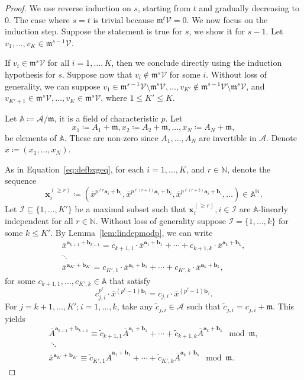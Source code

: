 \documentclass[letterpaper, 11pt, thm-restate]{article}
\numberwithin{equation}{section}
\newcommand{\N}{\mathbb{N}}
\newcommand{\A}{\mathbb{A}}
\newcommand{\mV}{\mathcal{V}}
\newcommand{\mI}{\mathcal{I}}
\newcommand{\mA}{\mathcal{A}}
\newcommand{\ba}{\boldsymbol{a}}
\newcommand{\bb}{\boldsymbol{b}}
\newcommand{\bx}{\boldsymbol{x}}
\newcommand{\tc}{\widetilde{c}}
\newcommand{\ox}{\overline{x}}
\newcommand{\oA}{\overline{A}}
\newcommand{\frm}{\mathfrak{m}}
\theoremstyle{definition}
\theoremstyle{definition}
\theoremstyle{definition}
\begin{document}
\begin{proof}
    We use reverse induction on $s$, starting from $t$ and gradually decreasing to $0$.
    The case where $s = t$ is trivial because $\frm^{t}\mV = 0$. We now focus on the induction step.
    Suppose the statement is true for $s$, we show it for $s-1$.
    Let $v_1, \ldots, v_K \in \frm^{s-1}\mV$.
    
    If $v_i \in \frm^{s} \mV$ for all $i = 1, \ldots, K$, then we conclude directly using the induction hypothesis for $s$.
    Suppose now that $v_i \notin \frm^{s} \mV$ for some $i$. 
    Without loss of generality, we can suppose $v_1 \in \frm^{s-1} \mV \setminus \frm^{s} \mV, \ldots, v_{K'} \notin \frm^{s-1} \mV \setminus \frm^{s} \mV$, and $v_{K'+1} \in \frm^{s} \mV, \ldots, v_K \in \frm^{s} \mV$, where $1 \leq K' \leq K$.
    
    Let $\A \coloneqq \mA/\frm$, it is a field of characteristic $p$.
    Let
    \[
    x_1 \coloneqq A_1 + \frm, x_2 \coloneqq A_2 + \frm, \ldots, x_N \coloneqq A_N + \frm,
    \]
    be elements of $\A$. These are non-zero since $A_1, \ldots, A_N$ are invertible in $\mA$. Denote $\ox \coloneqq (x_1, \ldots, x_N)$.
    
    As in Equation~\eqref{eq:defbxgeq}, for each $i = 1, \ldots, K$, and $r \in \N$, denote the sequence
    \[
    \bx_i^{(\geq r)} \coloneqq (\ox^{p^{\ell r} \ba_i + \bb_i}, \ox^{p^{\ell (r+1)} \ba_i + \bb_i}, \ox^{p^{\ell (r+2)} \ba_i + \bb_i}, \ldots) \in \A^{\N}.
    \]
    Let $\mI \subseteq \{1, \ldots, K'\}$ be a maximal subset such that $\bx_i^{(\geq r)}, i \in \mI$ are $\A$-linearly independent for all $r \in \N$.
    Without loss of generality suppose $\mI = \{1, \ldots, k\}$ for some $k \leq K'$.
    By Lemma~\ref{lem:lindepmodp}, we can write
    \begin{multline*}
    \ox^{\ba_{k+1} + \bb_{k+1}} = c_{k+1,1} \cdot \ox^{\ba_1 + \bb_1} + \cdots + c_{k+1,k} \cdot \ox^{\ba_k + \bb_k}, \\
    \ddots \\
    \ox^{\ba_{K'} + \bb_{K'}} = c_{K',1} \cdot \ox^{\ba_1 + \bb_1} + \cdots + c_{K',k} \cdot \ox^{\ba_k + \bb_k},
    \end{multline*}
    for some $c_{k+1, 1}, \ldots, c_{K', k} \in \A$ that satisfy
    \begin{equation}\label{eq:condc}
    c_{j,i}^{p^{\ell}} \cdot \ox^{(p^{\ell} - 1) \bb_i} = c_{j,i} \cdot \ox^{(p^{\ell}-1)\bb_j}.
    \end{equation}
    For $j = k+1, \ldots, K'; i = 1, \ldots, k$, take any $\tc_{j, i} \in \mA$ such that $\tc_{j, i} = c_{j, i} + \frm$.
    This yields
    \begin{multline*}
    \oA^{\ba_{k+1} + \bb_{k+1}} \equiv \tc_{k+1,1} \oA^{\ba_1 + \bb_1} + \cdots + \tc_{k+1,k} \oA^{\ba_k + \bb_k} \mod \frm, \\\;\ddots\; \\
    \ox^{\ba_{K'} + \bb_{K'}} \equiv \tc_{K',1} \oA^{\ba_1 + \bb_1} + \cdots + \tc_{K',k} \oA^{\ba_k + \bb_k} \mod \frm.
    \end{multline*}
    

\end{proof}
\end{document}

